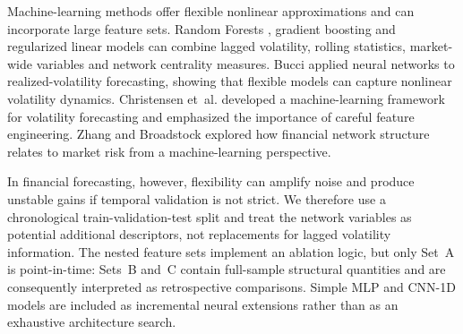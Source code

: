 Machine-learning methods offer flexible nonlinear approximations and can incorporate large feature sets. Random Forests \cite{breiman_2001_random}, gradient boosting \cite{friedman_2001_greedy} and regularized linear models \cite{hoerl_kennard_1970_ridge} can combine lagged volatility, rolling statistics, market-wide variables and network centrality measures. Bucci \cite{bucci_2020_realized} applied neural networks to realized-volatility forecasting, showing that flexible models can capture nonlinear volatility dynamics. Christensen et~al. \cite{christensen_2022_realized} developed a machine-learning framework for volatility forecasting and emphasized the importance of careful feature engineering. Zhang and Broadstock \cite{zhang_2023_network_volatility} explored how financial network structure relates to market risk from a machine-learning perspective.

In financial forecasting, however, flexibility can amplify noise and produce unstable gains if temporal validation is not strict. We therefore use a chronological train-validation-test split and treat the network variables as potential additional descriptors, not replacements for lagged volatility information. The nested feature sets implement an ablation logic, but only Set~A is point-in-time: Sets~B and~C contain full-sample structural quantities and are consequently interpreted as retrospective comparisons. Simple MLP and CNN-1D models are included as incremental neural extensions rather than as an exhaustive architecture search.
